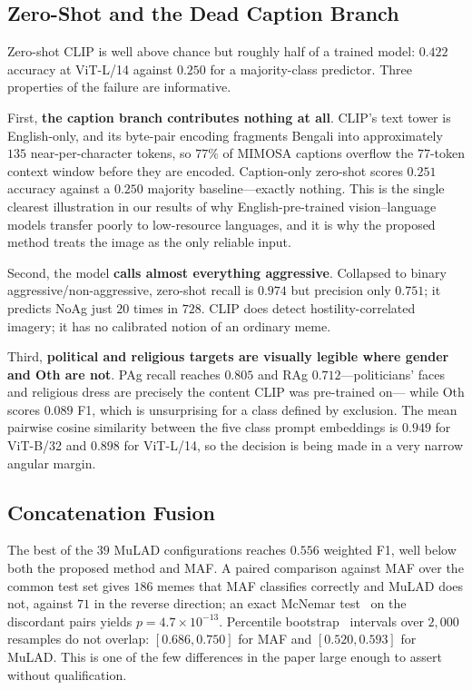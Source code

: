 \documentclass[conference]{IEEEtran}
\begin{document}
\subsection{Zero-Shot and the Dead Caption Branch}
\label{sec:results-zeroshot}

Zero-shot CLIP is well above chance but roughly half of a trained model:
$0.422$ accuracy at ViT-L/14 against $0.250$ for a majority-class predictor.
Three properties of the failure are informative.

First, \textbf{the caption branch contributes nothing at all}. CLIP's text tower
is English-only, and its byte-pair encoding fragments Bengali into approximately
$135$ near-per-character tokens, so $77\%$ of MIMOSA captions overflow the
$77$-token context window before they are encoded. Caption-only zero-shot scores
$0.251$ accuracy against a $0.250$ majority baseline---exactly nothing. This is
the single clearest illustration in our results of why English-pre-trained
vision--language models transfer poorly to low-resource languages, and it is why
the proposed method treats the image as the only reliable input.

Second, the model \textbf{calls almost everything aggressive}. Collapsed to
binary aggressive/non-aggressive, zero-shot recall is $0.974$ but precision only
$0.751$; it predicts NoAg just $20$ times in $728$. CLIP does detect
hostility-correlated imagery; it has no calibrated notion of an ordinary meme.

Third, \textbf{political and religious targets are visually legible where gender
and Oth are not}. PAg recall reaches $0.805$ and RAg $0.712$---politicians'
faces and religious dress are precisely the content CLIP was pre-trained on---
while Oth scores $0.089$ F1, which is unsurprising for a class defined by
exclusion. The mean pairwise cosine similarity between the five class prompt
embeddings is $0.949$ for ViT-B/32 and $0.898$ for ViT-L/14, so the decision is
being made in a very narrow angular margin.

\subsection{Concatenation Fusion}
\label{sec:results-mulad}

The best of the $39$ MuLAD configurations reaches $0.556$ weighted F1, well
below both the proposed method and MAF. A paired comparison against MAF over the
common test set gives $186$ memes that MAF classifies correctly and MuLAD does
not, against $71$ in the reverse direction; an exact McNemar test~\cite{mcnemar1947}
on the discordant pairs yields $p = 4.7 \times 10^{-13}$. Percentile bootstrap~\cite{efron1979}
intervals over $2{,}000$ resamples do not overlap: $[0.686, 0.750]$ for MAF and
$[0.520, 0.593]$ for MuLAD. This is one of the few differences in the paper
large enough to assert without qualification.
\end{document}
